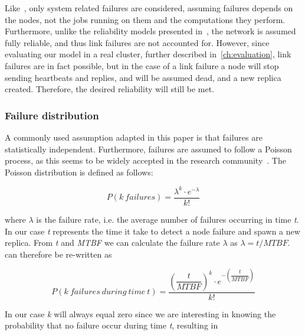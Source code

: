 \documentclass{cslthse-msc}
\begin{document}
Like~\cite{selfAdaptRel}, only system related failures are considered, assuming failures depends on the nodes, not the jobs running on them and the computations they perform. Furthermore, unlike the reliability models presented in~\cite{taskSchedulingReplication, taskAllocationSwarm, relAnalysisFRA}, the network is assumed fully reliable, and thus link failures are not accounted for. However, since evaluating our model in a real cluster, further described in~\cref{ch:evaluation}, link failures are in fact possible, but in the case of a link failure a node will stop sending heartbeats and replies, and will be assumed dead, and a new replica created. Therefore, the desired reliability will still be met. 

\subsubsection{Failure distribution}
A commonly used assumption adapted in this paper is that failures are statistically independent. Furthermore, failures are assumed to follow a Poisson process, as this seems to be widely accepted in the research community~\cite{experimentalFailureAssessment}. The Poisson distribution is defined as follows:

\begin{equation} \label{eq:Poisson}
P(k\ failures) = \dfrac{\lambda^k \cdot e^{-\lambda}}{k!}
\end{equation}

where $\lambda$ is the failure rate, i.e. the average number of failures occurring in time \emph{t}. In our case \emph{t} represents the time it take to detect a node failure and spawn a new replica. From \emph{t} and \emph{MTBF} we can calculate the failure rate $\lambda$ as $\lambda = t/MTBF$.  can therefore be re-written as

\begin{equation} \label{eq:Poisson_during_time_t}
P(k\ failures\ during\ time\ t) = \dfrac{\left(\dfrac{t}{MTBF}\right)^k \cdot e^{-\left(\dfrac{t}{MTBF}\right)}}{k!}
\end{equation}

In our case \emph{k} will always equal zero since we are interesting in knowing the probability that no failure occur during time \emph{t}, resulting in
\end{document}
